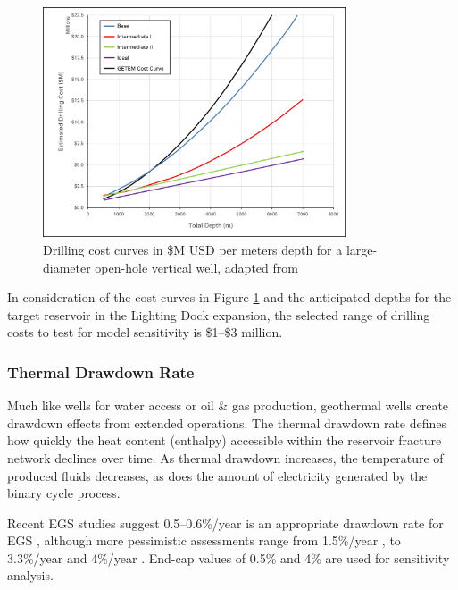\begin{figure}
\centering
\includegraphics[width=0.8\textwidth]{templates/images/Figure-Drilling_Cost_Curves.png}
\singlespacing
\caption[GeoVision drilling cost curves]{Drilling cost curves in \$M USD per meters depth for a large-diameter open-hole vertical well, adapted from \citep[Figure 8]{augustine_geovision_2019}}
\label{fig:drill_cost_curves}
\end{figure}

In consideration of the cost curves in Figure \ref{fig:drill_cost_curves} and the anticipated depths for the target reservoir in the Lighting Dock expansion, the selected range of drilling costs to test for model sensitivity is \$1--\$3 million.

\subsubsection{Thermal Drawdown Rate}\label{ch4:drawdown_uncertainty}
Much like wells for water access or oil \& gas production, geothermal wells create drawdown effects from extended operations. The thermal drawdown rate defines how quickly the heat content (enthalpy) accessible within the reservoir fracture network declines over time. As thermal drawdown increases, the temperature of produced fluids decreases, as does the amount of electricity generated by the binary cycle process.

Recent EGS studies suggest 0.5--0.6\%/year is an appropriate drawdown rate for EGS \citep{augustine_geovision_2019}, although more pessimistic assessments range from 1.5\%/year \citep{beckers_low-temperature_2016}, to 3.3\%/year \citep{augustine_comparison_2006} and 4\%/year \citep{tester_economic_1990}. End-cap values of 0.5\% and 4\% are used for sensitivity analysis.


